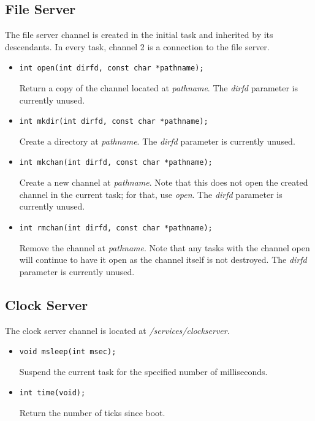 \documentclass[letterpaper]{article}
\begin{document}
\subsection{File Server}
The file server channel is created in the initial task and inherited
by its descendants. In every task, channel 2 is a connection to the
file server.
\begin{itemize}
\item \begin{verbatim}int open(int dirfd, const char *pathname);\end{verbatim}
	Return a copy of the channel located at \emph{pathname}.
	The \emph{dirfd} parameter is currently unused.
\item \begin{verbatim}int mkdir(int dirfd, const char *pathname);\end{verbatim}
	Create a directory at \emph{pathname}.
	The \emph{dirfd} parameter is currently unused.
\item \begin{verbatim}int mkchan(int dirfd, const char *pathname);\end{verbatim}
	Create a new channel at \emph{pathname}. Note that this does not open
	the created channel in the current task; for that, use \emph{open}.
	The \emph{dirfd} parameter is currently unused.
\item \begin{verbatim}int rmchan(int dirfd, const char *pathname);\end{verbatim}
	Remove the channel at \emph{pathname}. Note that any tasks with the
	channel open will continue to have it open as the channel itself
	is not destroyed.
	The \emph{dirfd} parameter is currently unused.
\end{itemize}
\subsection{Clock Server}
The clock server channel is located at \emph{/services/clockserver}.
\begin{itemize}
\item \begin{verbatim}void msleep(int msec);\end{verbatim}
Suspend the current task for the specified number of milliseconds.
\item \begin{verbatim}int time(void);\end{verbatim}
Return the number of ticks since boot.
\end{itemize}
\end{document}
